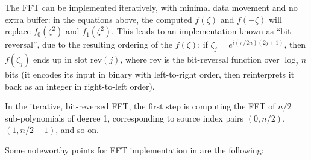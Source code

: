 The FFT can be implemented iteratively, with minimal data movement and
no extra buffer: in the equations above, the computed $f(\zeta)$ and
$f(-\zeta)$ will replace $f_0(\zeta^2)$ and $f_1(\zeta^2)$. This leads
to an implementation known as ``bit reversal'', due to the resulting
ordering of the $f(\zeta)$: if $\zeta_j = e^{i(\pi/2n)(2j+1)}$, then
$f(\zeta_j)$ ends up in slot $\text{rev}(j)$, where $\text{rev}$ is the
bit-reversal function over $\log_2 n$ bits (it encodes its input in
binary with left-to-right order, then reinterprets it back as an integer
in right-to-left order).

In the iterative, bit-reversed FFT, the first step is computing the
FFT of $n/2$ sub-polynomials of degree 1, corresponding to source
index pairs $(0,n/2)$, $(1,n/2+1)$, and so on.

Some noteworthy points for FFT implementation in \falcon are the
following:
